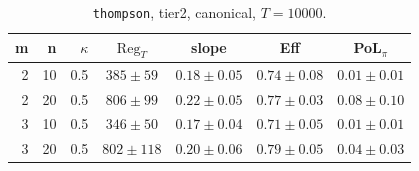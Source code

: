 \begin{table}[htbp]
\centering
\scriptsize
\caption{\texttt{thompson}, tier2, canonical, $T=10000$.}
\label{tab:tier2_long_thompson}
\begin{tabular}{@{}rrrcccc@{}}
\toprule
m & n & $\kappa$ & $\mathrm{Reg}_T$ & slope & Eff & PoL$_\pi$ \\
\midrule
2 & 10 & 0.5 & $385 \pm 59$ & $0.18 \pm 0.05$ & $0.74 \pm 0.08$ & $0.01 \pm 0.01$ \\
2 & 20 & 0.5 & $806 \pm 99$ & $0.22 \pm 0.05$ & $0.77 \pm 0.03$ & $0.08 \pm 0.10$ \\
\midrule
3 & 10 & 0.5 & $346 \pm 50$ & $0.17 \pm 0.04$ & $0.71 \pm 0.05$ & $0.01 \pm 0.01$ \\
3 & 20 & 0.5 & $802 \pm 118$ & $0.20 \pm 0.06$ & $0.79 \pm 0.05$ & $0.04 \pm 0.03$ \\
\bottomrule
\end{tabular}
\end{table}
